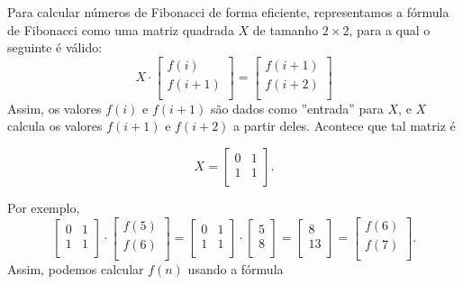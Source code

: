 \begin{samepage}
Para calcular números de Fibonacci de forma eficiente,
representamos a
fórmula de Fibonacci como uma
matriz quadrada $X$ de tamanho $2 \times 2$,
para a qual o seguinte é válido:
\[ X \cdot
 \begin{bmatrix}
  f(i) \\
  f(i+1) \\
 \end{bmatrix}
=
 \begin{bmatrix}
  f(i+1) \\
  f(i+2) \\
 \end{bmatrix}
 \]
Assim, os valores $f(i)$ e $f(i+1)$ são dados como
''entrada'' para $X$,
e $X$ calcula os valores $f(i+1)$ e $f(i+2)$
a partir deles.
Acontece que tal matriz é

\[ X = 
 \begin{bmatrix}
  0 & 1 \\
  1 & 1 \\
 \end{bmatrix}.
\]
\end{samepage}
\noindent
Por exemplo,
\[
 \begin{bmatrix}
  0 & 1 \\
  1 & 1 \\
 \end{bmatrix}
\cdot
 \begin{bmatrix}
  f(5) \\
  f(6) \\
 \end{bmatrix}
=
 \begin{bmatrix}
  0 & 1 \\
  1 & 1 \\
 \end{bmatrix}
\cdot
 \begin{bmatrix}
  5 \\
  8 \\
 \end{bmatrix}
=
 \begin{bmatrix}
  8 \\
  13 \\
 \end{bmatrix}
=
 \begin{bmatrix}
  f(6) \\
  f(7) \\
 \end{bmatrix}.
\]
Assim, podemos calcular $f(n)$ usando a fórmula
